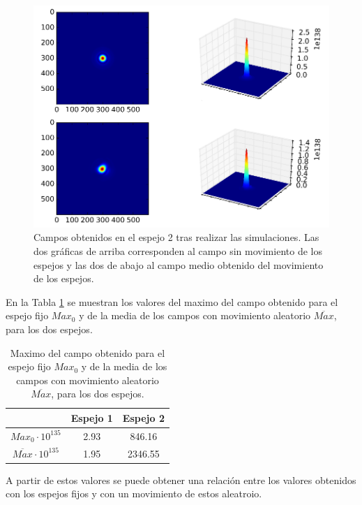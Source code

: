 \documentclass[twoside]{article}
\begin{document}
\begin{multicols}{2}
					\begin{figure}[H]
						\centering
						\includegraphics[scale=0.25]{FiguraEspejo2.png}
						\caption{\label{Img:Espejo2}Campos obtenidos en el espejo 2 tras realizar las simulaciones. Las dos gráficas de arriba corresponden al campo sin movimiento de los espejos y las dos de abajo al campo medio obtenido del movimiento de los espejos.}
					\end{figure}

				En la Tabla \ref{Tab:Maximum} se muestran los valores del maximo del campo obtenido para el espejo fijo $Max_0$ y de la media de los campos con movimiento aleatorio $\overline{Max}$, para los dos espejos.

					\begin{table}[H]
						\centering
						\begin{tabular}{c | c c }
							\hline
							\centering
								 & Espejo 1 & Espejo 2 \\ \hline
								$Max_0 \cdot 10^{135}$ & 2.93 & 846.16 \\
								$\overline{Max} \cdot 10^{135}$ & 1.95 & 2346.55 \\ \hline

						\end{tabular}
						\caption{\label{Tab:Maximum}Maximo del campo obtenido para el espejo fijo $Max_0$ y de la media de los campos con movimiento aleatorio $\overline{Max}$, para los dos espejos.}
					\end{table}
			
				A partir de estos valores se puede obtener una relaci\'on entre los valores obtenidos con los espejos fijos y con un movimiento de estos aleatroio.


\end{multicols}
\end{document}
